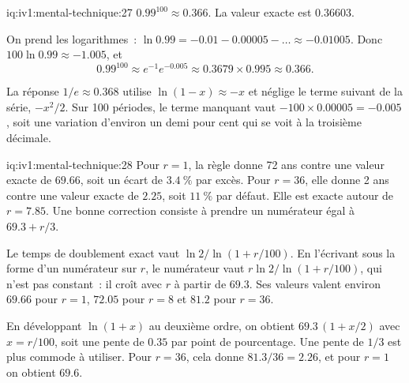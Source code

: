 \begin{solution}{iq:iv1:mental-technique:27}
$0.99^{100} \approx 0.366$. La valeur exacte est $0.36603$.

On prend les logarithmes~: $\ln 0.99 = -0.01 - 0.00005 - \dots \approx -0.01005$. Donc $100 \ln 0.99 \approx -1.005$, et
\[
0.99^{100} \approx e^{-1} e^{-0.005} \approx 0.3679 \times 0.995 \approx 0.366.
\]

La réponse $1/e \approx 0.368$ utilise $\ln(1 - x) \approx -x$ et néglige le terme suivant de la série, $-x^2/2$. Sur 100 périodes, le terme manquant vaut $-100 \times 0.00005 = -0.005$, soit une variation d'environ un demi pour cent qui se voit à la troisième décimale.

\end{solution}

\begin{solution}{iq:iv1:mental-technique:28}
Pour $r = 1$, la règle donne 72 ans contre une valeur exacte de $69.66$, soit un écart de $3.4~\%$ par excès. Pour $r = 36$, elle donne 2 ans contre une valeur exacte de $2.25$, soit $11~\%$ par défaut. Elle est exacte autour de $r = 7.85$. Une bonne correction consiste à prendre un numérateur égal à $69.3 + r/3$.

Le temps de doublement exact vaut $\ln 2 / \ln(1 + r/100)$. En l'écrivant sous la forme d'un numérateur sur $r$, le numérateur vaut $r \ln 2 / \ln(1 + r/100)$, qui n'est pas constant~: il croît avec $r$ à partir de $69.3$. Ses valeurs valent environ $69.66$ pour $r = 1$, $72.05$ pour $r = 8$ et $81.2$ pour $r = 36$.

En développant $\ln(1 + x)$ au deuxième ordre, on obtient $69.3\,(1 + x/2)$ avec $x = r/100$, soit une pente de $0.35$ par point de pourcentage. Une pente de $1/3$ est plus commode à utiliser. Pour $r = 36$, cela donne $81.3/36 = 2.26$, et pour $r = 1$ on obtient $69.6$.

\end{solution}

